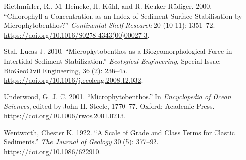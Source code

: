 \documentclass[
  letterpaper,
  DIV=11,
  numbers=noendperiod]{scrartcl}
\newlength{\cslhangindent}
\newenvironment{CSLReferences}[2] %
 {\begin{list}{}{%
  \setlength{\itemindent}{0pt}
  \setlength{\leftmargin}{0pt}
  \setlength{\parsep}{0pt}
  \ifodd #1
   \setlength{\leftmargin}{\cslhangindent}
   \setlength{\itemindent}{-1\cslhangindent}
  \fi
  \setlength{\itemsep}{#2\baselineskip}}}
 {\end{list}}
\begin{document}
\begin{CSLReferences}{1}{0}
Riethmüller, R., M. Heineke, H. Kühl, and R. Keuker-Rüdiger. 2000.
{``Chlorophyll a Concentration as an Index of Sediment Surface
Stabilisation by Microphytobenthos?''} \emph{Continental Shelf Research}
20 (10-11): 1351--72.
\url{https://doi.org/10.1016/S0278-4343(00)00027-3}.

Stal, Lucas J. 2010. {``Microphytobenthos as a Biogeomorphological Force
in Intertidal Sediment Stabilization.''} \emph{Ecological Engineering},
Special {Issue}: {BioGeoCivil} {Engineering}, 36 (2): 236--45.
\url{https://doi.org/10.1016/j.ecoleng.2008.12.032}.

Underwood, G. J. C. 2001. {``Microphytobenthos.''} In \emph{Encyclopedia
of {Ocean} {Sciences}}, edited by John H. Steele, 1770--77. Oxford:
Academic Press. \url{https://doi.org/10.1006/rwos.2001.0213}.

Wentworth, Chester K. 1922. {``A {Scale} of {Grade} and {Class} {Terms}
for {Clastic} {Sediments}.''} \emph{The Journal of Geology} 30 (5):
377--92. \url{https://doi.org/10.1086/622910}.

\end{CSLReferences}
\end{document}
